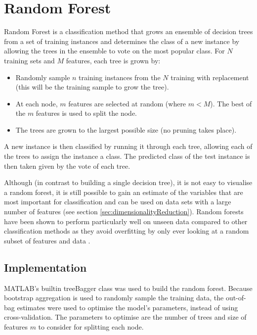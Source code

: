 \section{Random Forest}

Random Forest is a classification method that grows an ensemble of decision trees from a set of training instances and determines the class of a new instance by allowing the trees in the ensemble to vote on the most popular class. For $N$ training sets and $M$ features, each tree is grown by:

\begin{itemize}
\item Randomly sample $n$ training instances from the $N$ training with replacement (this will be the training sample to grow the tree).
\item At each node, $m$ features are selected at random (where $m < M$). The best of the $m$ features is used to split the node.
\item The trees are grown to the largest possible size (no pruning takes place).
\end{itemize}

A new instance is then classified by running it through each tree, allowing each of the trees to assign the instance a class. The predicted class of the test instance is then taken given by the vote of each tree.

Although (in contrast to building a single decision tree), it is not easy to visualise a random forest, it is still possible to gain an estimate of the variables that are most important for classification and can be used on data sets with a large number of features (see section \ref{sec:dimensionalityReduction}). Random forests have been shown to perform particularly well on unseen data compared to other classification methods as they avoid overfitting by only ever looking at a random subset of features and data \cite{Breiman}. 

\subsection{Implementation}

MATLAB's builtin treeBagger class was used to build the random forest. Because bootstrap aggregation is used to randomly sample the training data, the out-of-bag estimates were used to optimise the model's parameters, instead of using cross-validation. The parameters to optimise are the number of trees and size of features $m$ to consider for splitting each node. 

